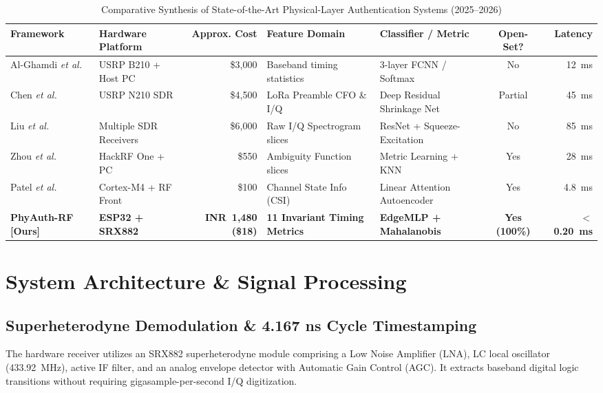\documentclass[11pt,a4paper]{article}
\begin{document}
\begin{table}[htbp]
\centering
\scriptsize
\caption{Comparative Synthesis of State-of-the-Art Physical-Layer Authentication Systems (2025--2026)}
\label{tab:sota}
\begin{tabularx}{\textwidth}{l p{2.2cm} r X X c r}
\toprule
\textbf{Framework} & \textbf{Hardware Platform} & \textbf{Approx. Cost} & \textbf{Feature Domain} & \textbf{Classifier / Metric} & \textbf{Open-Set?} & \textbf{Latency} \\
\midrule
Al-Ghamdi \textit{et al.} \cite{alghamdi2025} & USRP B210 + Host PC & \$3,000 & Baseband timing statistics & 3-layer FCNN / Softmax & No & 12~ms \\
Chen \textit{et al.} \cite{chen2025} & USRP N210 SDR & \$4,500 & LoRa Preamble CFO \& I/Q & Deep Residual Shrinkage Net & Partial & 45~ms \\
Liu \textit{et al.} \cite{liu2025} & Multiple SDR Receivers & \$6,000 & Raw I/Q Spectrogram slices & ResNet + Squeeze-Excitation & No & 85~ms \\
Zhou \textit{et al.} \cite{zhou2025} & HackRF One + PC & \$550 & Ambiguity Function slices & Metric Learning + KNN & Yes & 28~ms \\
Patel \textit{et al.} \cite{patel2026} & Cortex-M4 + RF Front & \$100 & Channel State Info (CSI) & Linear Attention Autoencoder & Yes & 4.8~ms \\
\textbf{PhyAuth-RF [Ours]} & \textbf{ESP32 + SRX882} & \textbf{INR~1,480 (\$18)} & \textbf{11 Invariant Timing Metrics} & \textbf{EdgeMLP + Mahalanobis} & \textbf{Yes (100\%)} & \textbf{$<$0.20~ms} \\
\bottomrule
\end{tabularx}
\end{table}

\section{System Architecture \& Signal Processing}
\subsection{Superheterodyne Demodulation \& 4.167 ns Cycle Timestamping}
The hardware receiver utilizes an SRX882 superheterodyne module comprising a Low Noise Amplifier (LNA), LC local oscillator (433.92~MHz), active IF filter, and an analog envelope detector with Automatic Gain Control (AGC). It extracts baseband digital logic transitions without requiring gigasample-per-second I/Q digitization.
\end{document}
